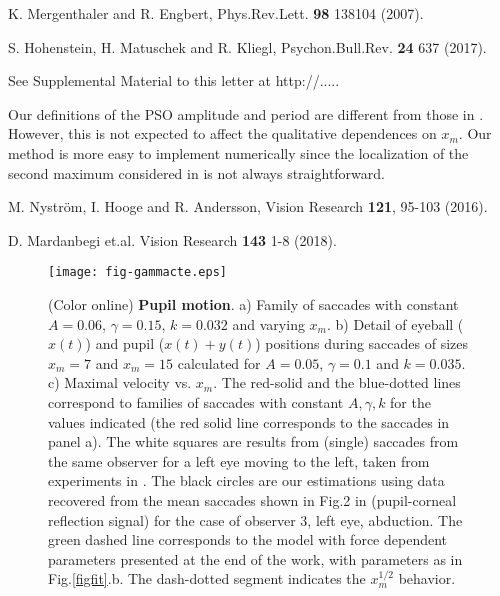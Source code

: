 \documentclass[prl]{revtex4}
\begin{document}
\begin{thebibliography}{99}
 K. Mergenthaler and R. Engbert, Phys.Rev.Lett. {\bf 98} 138104 (2007).

 S. Hohenstein, H. Matuschek and R. Kliegl, Psychon.Bull.Rev. {\bf 24} 637 (2017).

 See Supplemental Material to this letter at http://.....

 Our definitions of the PSO amplitude and period are different from those in \cite{holm}. However, this is not expected to affect the qualitative dependences on $x_m$. Our method is more easy to implement numerically since the localization of the second maximum considered in \cite{holm} is not always straightforward. 

 M. Nystr\"om, I. Hooge and R. Andersson, Vision Research {\bf 121}, 95-103 (2016). %

 D. Mardanbegi et.al. Vision Research {\bf 143} 1-8 (2018).


\end{thebibliography}



\begin{figure}  
\texttt{[image: fig-gammacte.eps]}
\caption{(Color online) {\bf Pupil motion}. a) Family of saccades with constant $A=0.06$, $\gamma=0.15$, $k=0.032$ and varying $x_m$. b) Detail of eyeball ($x(t)$) and pupil ($x(t)+y(t)$) positions during saccades of sizes $x_m=7$ and $x_m=15$ calculated for $A=0.05$, $\gamma=0.1$ and $k=0.035$.  c) Maximal velocity vs. $x_m$. The red-solid and the blue-dotted lines correspond to families of saccades with constant $A, \gamma, k$ for the values indicated (the red solid line corresponds to the saccades in panel a). The white squares are results from (single) saccades from the same observer for a left eye moving to the left, taken from  experiments in \cite{gasaneo2017}. The black circles are our estimations using data recovered from the mean saccades shown in Fig.2 in \cite{holm} (pupil-corneal reflection signal) for the case of observer 3, left eye, abduction. The green dashed line corresponds to the model with force dependent parameters presented at the end of the work, with parameters as in Fig.\ref{figfit}.b. The dash-dotted segment indicates the $x_m^{1/2}$ behavior.}
\label{figgamcte}
\end{figure}
\end{document}
